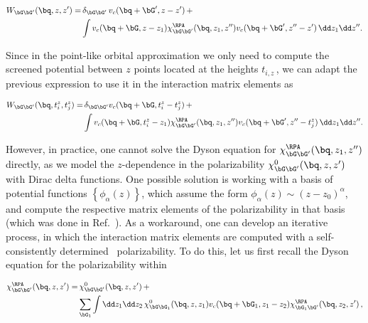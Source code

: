 \begin{equation}
\begin{aligned}
    W_{\bG \bG'}(\bq,z,z') =  & \,\delta_{\bG \bG'}\,v_{c}( \bq +\bG',z-z') \,+ \\
 & \int v_{c}( \bq +\bG,z-z_{1})\chi^{\RPA}_{\bG \bG'}(\bq,z_{1},z'')v_{c}( \bq +\bG',z''-z')\, \dd z_{1}\dd z'' .
\end{aligned}
\end{equation}

\noindent Since in the point-like orbital approximation we only need to compute
the screened potential between $z$ points located at the heights $t_{i,z}$\,, we can adapt the previous expression
to use it in the interaction matrix elements as

\begin{equation}
    \begin{aligned}
        W_{\bG \bG'}(\bq,t_{i}^{z},t_{j}^{z}) = &\, \delta_{\bG \bG'}v_{c}( \bq +\bG,t_{i}^{z}-t_{j}^{z}) \,+ \\
        & \int v_{c}( \bq +\bG,t_{i}^{z}-z_{1})\chi^{\RPA}_{\bG \bG'}(\bq,z_{1},z'')v_{c}( \bq +\bG',z''-t_{j}^{z}) \, \dd z_{1}\dd z''.
    \end{aligned}
\end{equation}

\noindent However, in practice, one cannot solve the Dyson equation for $\chi^{\RPA}_{\bG \bG'}(\bq,z_{1},z'')$
directly, as we model the $z$-dependence in the polarizability
$\chi^{0}_{\bG \bG'}(\bq,z,z')$
with Dirac delta functions.
One possible solution is working with a basis
of potential functions $\left\{ \phi_{\alpha}( z)\right\}$,
which assume the form $\phi_{\alpha}( z)\sim( z-z_{0})^{\alpha}$,
and compute the respective matrix elements of the polarizability in
that basis (which was done in Ref.~\cite{Dielectric_Genome}).
As a workaround, one can develop an iterative process,
in which the interaction matrix elements are computed with a self-consistently
determined \rpa~polarizability.
To do this, let us first recall the Dyson
equation for the polarizability within \rpa

\begin{equation}
    \begin{aligned}
        \chi^{\RPA}_{\bG \bG'}(\bq,z,z') =& \,\chi^{0}_{\bG \bG'}(\bq,z,z')\,+ \\
        & \sum_{\bG_{1}} \int\dd z_{1} \dd z_{2}\,\chi^{0}_{\bG \bG_{1}}(\bq,z,z_{1})v_{c}( \bq +\bG_{1},z_{1}-z_{2})\chi^{\RPA}_{\bG_{1} \bG'}(\bq,z_{2},z')\,,
    \end{aligned}
\end{equation}


